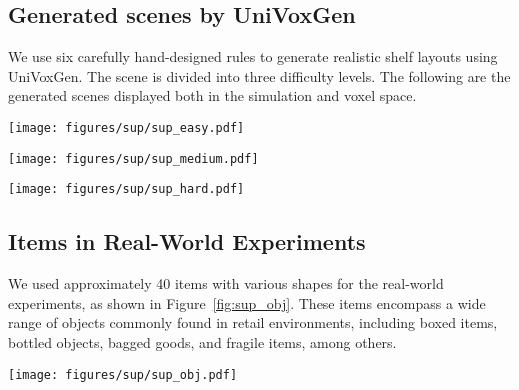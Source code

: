 \subsection{Generated scenes by UniVoxGen}
\label{Generated_scene}
We use six carefully hand-designed rules to generate realistic shelf layouts using UniVoxGen. The scene is divided into three difficulty levels. The following are the generated scenes displayed both in the simulation and voxel space.

\begin{figure*}[tb]
    \centering
    \texttt{[image: figures/sup/sup\_easy.pdf]}
    \caption{Easy scenes, the first and third columns show the scenes in the simulation, while the second and fourth columns display the scenes generated by UniVoxGen.}
    \label{fig:sup_easy}
\end{figure*}


\begin{figure*}[tb]
    \centering
    \texttt{[image: figures/sup/sup\_medium.pdf]}
    \caption{Medium scenes, the first and third columns show the scenes in the simulation, while the second and fourth columns display the scenes generated by UniVoxGen.}
    \label{fig:sup_medium}
\end{figure*}


\begin{figure*}[tb]
    \centering
    \texttt{[image: figures/sup/sup\_hard.pdf]}
    \caption{Hard scenes, the first and third columns show the scenes in the simulation, while the second and fourth columns display the scenes generated by UniVoxGen.}
    \label{fig:sup_hard}
\end{figure*}


\subsection{Items in Real-World Experiments}
We used approximately 40 items with various shapes for the real-world experiments, as shown in Figure~\ref{fig:sup_obj}. These items encompass a wide range of objects commonly found in retail environments, including boxed items, bottled objects, bagged goods, and fragile items, among others.
\begin{figure*}[tb]
    \centering
    \texttt{[image: figures/sup/sup\_obj.pdf]}
    \caption{Items in Real-World Experiments}
    \label{fig:sup_obj}
\end{figure*}


